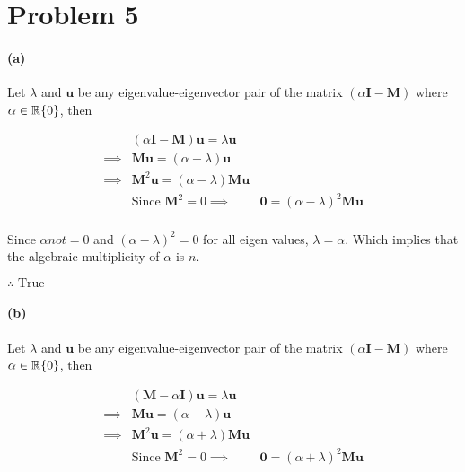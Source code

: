 \documentclass[12pt, letterpaper]{article}
\begin{document}
\pagebreak
\section*{Problem 5}

\paragraph{(a)} Let $\lambda$ and $\mathbf{u}$ be any eigenvalue-eigenvector pair of the matrix $(\alpha \mathbf{I} - \mathbf{M})$ where $\alpha \in \mathbb{R}\\\{0\}$, then

\begin{align*}
  &(\alpha \mathbf{I} - \mathbf{M})\mathbf{u} = \lambda \mathbf{u} \\
  \implies &\mathbf{M}\mathbf{u} = (\alpha - \lambda)\mathbf{u} \\
  \implies &\mathbf{M}^2\mathbf{u} = (\alpha - \lambda)\mathbf{Mu} \\
  &\text{Since $\mathbf{M}^2 = 0$}
  \implies &\mathbf{0} = (\alpha - \lambda)^2\mathbf{Mu} \\
\end{align*}

Since $\alpha not = 0$ and $(\alpha - \lambda)^2 = 0$ for all eigen values, $\lambda = \alpha$. Which implies that the algebraic multiplicity of $\alpha$ is $n$.

\vspace{1cm}
$\boxed{\therefore \text{ True }}$

\paragraph{(b)} Let $\lambda$ and $\mathbf{u}$ be any eigenvalue-eigenvector pair of the matrix $(\alpha \mathbf{I} - \mathbf{M})$ where $\alpha \in \mathbb{R}\\\{0\}$, then

\begin{align*}
  &(\mathbf{M} - \alpha \mathbf{I})\mathbf{u} = \lambda \mathbf{u} \\
  \implies &\mathbf{M}\mathbf{u} = (\alpha + \lambda)\mathbf{u} \\
  \implies &\mathbf{M}^2\mathbf{u} = (\alpha + \lambda)\mathbf{Mu} \\
  &\text{Since $\mathbf{M}^2 = 0$}
  \implies &\mathbf{0} = (\alpha + \lambda)^2\mathbf{Mu} \\
\end{align*}
\end{document}
